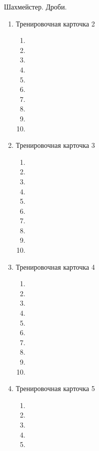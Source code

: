 \documentclass[12pt, a4paper]{article}
\begin{document}
	
Шахмейстер. Дроби.
\begin{enumerate}
	\item Тренировочная карточка 2
	\begin{enumerate}[label=\asbuk*)]
		\item 
		\item 
		\item 
		\item 
		\item 
		\item 
		\item 
		\item 
		\item 
		\item 
	\end{enumerate}
	\item Тренировочная карточка 3
		\begin{enumerate}[label=\asbuk*)]
		\item 
		\item 
		\item 
		\item 
		\item 
		\item 
		\item 
		\item 
		\item 
		\item 
	\end{enumerate}
	\item Тренировочная карточка 4
		\begin{enumerate}[label=\asbuk*)]
			\item 
			\item 
			\item 	
			\item 
			\item 
			\item 
			\item 
			\item 
			\item 
			\item 
		\end{enumerate}
	\item Тренировочная карточка 5
		\begin{enumerate}[label=\asbuk*)]
			\item 
			\item 
			\item 
			\item 
			\item 

\end{enumerate}
\end{enumerate}
\end{document}
